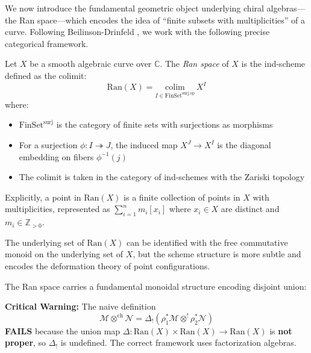 We now introduce the fundamental geometric object underlying chiral algebras---the Ran space---which 
encodes the idea of ``finite subsets with multiplicities'' of a curve. Following Beilinson-Drinfeld 
\cite{BD04}, we work with the following precise categorical framework.
 
\begin{definition}\label{def:ran-precise}
Let $X$ be a smooth algebraic curve over $\mathbb{C}$. The \emph{Ran space} of $X$ is the ind-scheme 
defined as the colimit:
\[
\text{Ran}(X) = \underset{I \in \text{FinSet}^{\text{surj,op}}}{\text{colim}} \, X^I
\]
where:
\begin{itemize}
\item $\text{FinSet}^{\text{surj}}$ is the category of finite sets with surjections as morphisms
\item For a surjection $\phi: I \twoheadrightarrow J$, the induced map $X^J \to X^I$ is the diagonal 
embedding on fibers $\phi^{-1}(j)$
\item The colimit is taken in the category of ind-schemes with the Zariski topology
\end{itemize}
Explicitly, a point in $\text{Ran}(X)$ is a finite collection of points in $X$ with multiplicities,
represented as $\sum_{i=1}^n m_i[x_i]$ where $x_i \in X$ are distinct and $m_i \in \mathbb{Z}_{>0}$.
\end{definition}
 
\begin{remark}
The underlying set of $\text{Ran}(X)$ can be identified with the free commutative monoid on the 
underlying set of $X$, but the scheme structure is more subtle and encodes the deformation theory
of point configurations.
\end{remark}
 
The Ran space carries a fundamental monoidal structure encoding disjoint union:
 
\begin{definition}\label{def:factorization}
\textbf{Critical Warning:} The naive definition 
$$\mathcal{M} \otimes^{\text{ch}} \mathcal{N} = \Delta_! \left( \rho_1^* \mathcal{M} \otimes^! \rho_2^* \mathcal{N} \right)$$
\textbf{FAILS} because the union map $\Delta: \text{Ran}(X) \times \text{Ran}(X) \to \text{Ran}(X)$ is \textbf{not proper}, 
so $\Delta_!$ is undefined. The correct framework uses factorization algebras.
\end{definition}

